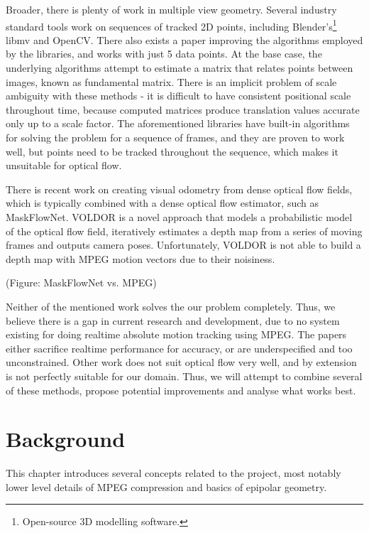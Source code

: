 \documentclass[11pt,english]{report}
\begin{document}
Broader, there is plenty of work in multiple view geometry. Several industry standard tools work on sequences of tracked 2D points, including Blender's\footnote{Open-source 3D modelling software.} libmv\cite{libmv} and OpenCV\cite{opencv5calib}. There also exists a paper improving the algorithms employed by the libraries, and works with just 5 data points\cite{1211470}. At the base case, the underlying algorithms attempt to estimate a matrix that relates points between images, known as fundamental matrix. There is an implicit problem of scale ambiguity\cite{hartley_zisserman_2004} with these methods - it is difficult to have consistent positional scale throughout time, because computed matrices produce translation values accurate only up to a scale factor. The aforementioned libraries have built-in algorithms for solving the problem for a sequence of frames, and they are proven to work well, but points need to be tracked throughout the sequence, which makes it unsuitable for optical flow.

There is recent work on creating visual odometry from dense optical flow fields\cite{voldor}, which is typically combined with a dense optical flow estimator, such as MaskFlowNet\cite{zhao2020maskflownet}. VOLDOR\cite{voldor} is a novel approach that models a probabilistic model of the optical flow field, iteratively estimates a depth map from a series of moving frames and outputs camera poses. Unfortunately, VOLDOR is not able to build a depth map with MPEG motion vectors due to their noisiness.

(Figure: MaskFlowNet vs. MPEG)

Neither of the mentioned work solves the our problem completely. Thus, we believe there is a gap in current research and development, due to no system existing for doing realtime absolute motion tracking using MPEG. The papers either sacrifice realtime performance for accuracy, or are underspecified and too unconstrained. Other work does not suit optical flow very well, and by extension is not perfectly suitable for our domain. Thus, we will attempt to combine several of these methods, propose potential improvements and analyse what works best.

\chapter{Background}

This chapter introduces several concepts related to the project, most notably lower level details of MPEG compression and basics of epipolar geometry.
\end{document}
